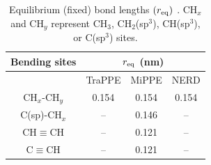\documentclass[journal=jced,manuscript=article]{achemso}
\begin{document}

    \begin{table}[h!]
		\caption{Equilibrium (fixed) bond lengths $(r_{\rm eq})$ \cite{Martin1999,Nath2001,Potoff_branched,Barhaghi2017}. CH$_x$ and CH$_y$ represent CH$_3$, CH$_2$(sp$^3$), CH(sp$^3$), or C(sp$^3$) sites.} \label{tab:bonds}
		\begin{center}
			\begin{tabular}{|c|c|c|c|}
				\hline
				Bending sites & \multicolumn{3}{|c|}{$r_{\rm eq}$ (nm)} \\ \hline
				& TraPPE & MiPPE & NERD \\ \hline
				CH$_x$-CH$_y$ & 0.154 & 0.154 & 0.154 \\ 
				C(sp)-CH$_x$ & -- & 0.146 & -- \\
				CH$\equiv$CH & -- & 0.121 & -- \\ 
				C$\equiv$CH & -- & 0.121 & -- \\
				\hline
			\end{tabular}
		\end{center} 
	\end{table}
    
\end{document}
